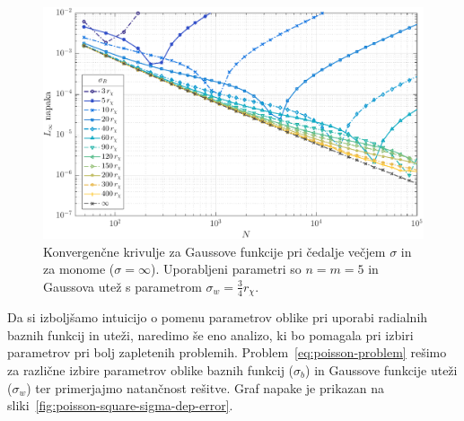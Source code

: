 \documentclass[12pt,a4paper,twoside]{article}
\theoremstyle{definition} %
\theoremstyle{plain} %
\numberwithin{equation}{section}
\newlength{\iw}
\begin{document}
\begin{figure}[h]
  \centering
  \includegraphics[width=\iw]{images/poisson_square_rbf_konv_k_mon.pdf}
  \caption[Konvergenčne krivulje za Gaussove funkcije.]{Konvergenčne krivulje
  za Gaussove funkcije pri čedalje večjem $\sigma$ in za monome ($\sigma =
  \infty$). Uporabljeni parametri so $n = m = 5$ in Gaussova utež s parametrom $\sigma_w =
  \frac34 r_\chi$.}
  \label{fig:rbf-konv-k-mon}
\end{figure}

Da si izboljšamo intuicijo o pomenu parametrov oblike pri uporabi radialnih
baznih funkcij in uteži, naredimo še eno analizo, ki bo pomagala pri izbiri
parametrov pri bolj zapletenih problemih. Problem~\eqref{eq:poisson-problem}
rešimo za različne izbire parametrov oblike baznih funkcij ($\sigma_b$) in
Gaussove funkcije uteži ($\sigma_w$) ter primerjajmo natančnost rešitve.
Graf napake je prikazan na sliki~\ref{fig:poisson-square-sigma-dep-error}.
\end{document}
